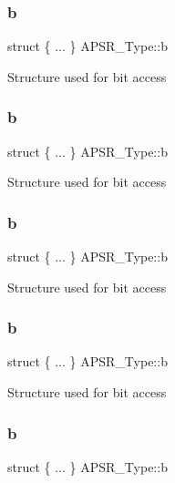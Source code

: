 \subsubsection{\texorpdfstring{b}{b}\hspace{0.1cm}{\footnotesize\ttfamily [7/12]}}
{\footnotesize\ttfamily struct \{ ... \}   A\+P\+S\+R\+\_\+\+Type\+::b}

Structure used for bit access \mbox{\label{union_a_p_s_r___type_acb547d8b76d2f9ed5c35aec568cf2e55}} 
\subsubsection{\texorpdfstring{b}{b}\hspace{0.1cm}{\footnotesize\ttfamily [8/12]}}
{\footnotesize\ttfamily struct \{ ... \}   A\+P\+S\+R\+\_\+\+Type\+::b}

Structure used for bit access \mbox{\label{union_a_p_s_r___type_a579abef7dd07846ef7bd5c5d1a95dd55}} 
\subsubsection{\texorpdfstring{b}{b}\hspace{0.1cm}{\footnotesize\ttfamily [9/12]}}
{\footnotesize\ttfamily struct \{ ... \}   A\+P\+S\+R\+\_\+\+Type\+::b}

Structure used for bit access \mbox{\label{union_a_p_s_r___type_a9707b62ddb0e311cb45d9ccd4a64ea7b}} 
\subsubsection{\texorpdfstring{b}{b}\hspace{0.1cm}{\footnotesize\ttfamily [10/12]}}
{\footnotesize\ttfamily struct \{ ... \}   A\+P\+S\+R\+\_\+\+Type\+::b}

Structure used for bit access \mbox{\label{union_a_p_s_r___type_a08e77fc4c13e2b1c22403ec38baf64a5}} 
\subsubsection{\texorpdfstring{b}{b}\hspace{0.1cm}{\footnotesize\ttfamily [11/12]}}
{\footnotesize\ttfamily struct \{ ... \}   A\+P\+S\+R\+\_\+\+Type\+::b}

